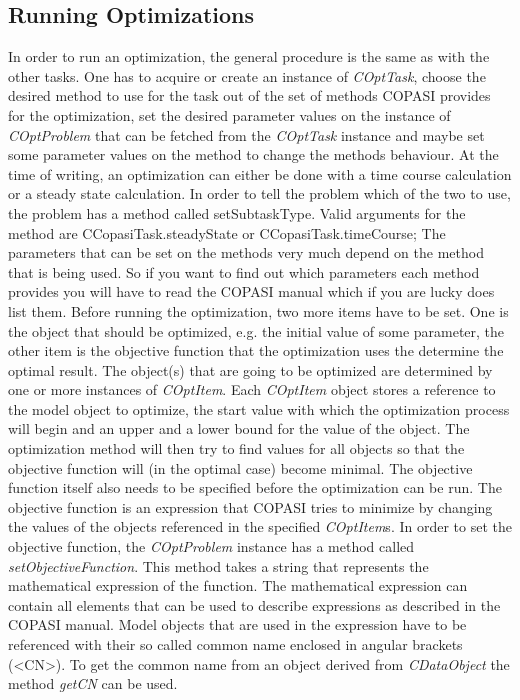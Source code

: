 \documentclass[a4,10pt]{article}
\begin{document}
\subsection{Running Optimizations}
In order to run an optimization, the general procedure is the same as with the other tasks. One has to acquire or create an instance of \textit{COptTask}, choose the desired method to use for the task out of the set of methods COPASI provides for the optimization, set the desired parameter values on the instance of \textit{COptProblem} that can be fetched from the \textit{COptTask} instance and maybe set some parameter values on the method to change the methods behaviour.
At the time of writing, an optimization can either be done with a time course calculation or a steady state calculation. In order to tell the problem which of the two to use, the problem has a method called setSubtaskType. Valid arguments for the method are CCopasiTask.steadyState or CCopasiTask.timeCourse;
The parameters that can be set on the methods very much depend on the method that is being used. So if you want to find out which parameters each method provides you will have to read the COPASI manual which if you are lucky does list them.
Before running the optimization, two more items have to be set. One is the object that should be optimized, e.g. the initial value of some parameter, the other item is the objective function that the optimization uses the determine the optimal result.
The object(s) that are going to be optimized are determined by one or more instances of \textit{COptItem}. Each \textit{COptItem} object stores a reference to the model object to optimize, the start value with which the optimization process will begin and an upper and a lower bound for the value of the object. The optimization method will then try to find values for all objects so that the objective function will (in the optimal case) become minimal.
The objective function itself also needs to be specified before the optimization can be run. The objective function is an expression that COPASI tries to minimize by changing the values of the objects referenced in the specified \textit{COptItem}s. In order to set the objective function, the \textit{COptProblem} instance has a method called \textit{setObjectiveFunction}. This method takes a string that represents the mathematical expression of the function. The mathematical expression can contain all elements that can be used to describe expressions as described in the COPASI manual. Model objects that are used in the expression have to be referenced with their so called common name enclosed in angular brackets (<CN>). To get the common name from an object derived from \textit{CDataObject} the method \textit{getCN} can be used.
\end{document}
